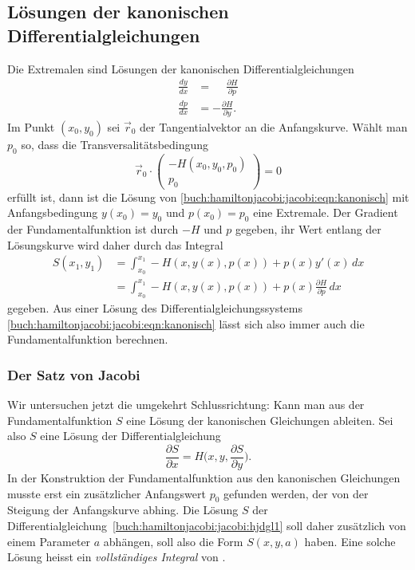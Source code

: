 %
%
\subsection{Lösungen der kanonischen Differentialgleichungen}
Die Extremalen sind Lösungen der kanonischen Differentialgleichungen
\begin{equation}
\begin{aligned}
\frac{dy}{dx}&=\phantom{-}\frac{\partial H}{\partial p}
\\
\frac{dp}{dx}&=-\frac{\partial H}{\partial y}.
\end{aligned}
\label{buch:hamiltonjacobi:jacobi:eqn:kanonisch}
\end{equation}
Im Punkt $(x_0,y_0)$ sei $\vec{r}_0$ der Tangentialvektor an die
Anfangskurve.
Wählt man $p_0$ so, dass die Transversalitätsbedingung
\[
\vec{r}_0
\cdot
\begin{pmatrix}
-H(x_0,y_0,p_0)\\
p_0
\end{pmatrix}
=
0
\]
erfüllt ist, dann ist die Lösung von
\eqref{buch:hamiltonjacobi:jacobi:eqn:kanonisch}
mit Anfangsbedingung $y(x_0)=y_0$ und $p(x_0)=p_0$ eine Extremale.
Der Gradient der Fundamentalfunktion ist durch $-H$ und $p$ gegeben,
ihr Wert entlang der Lösungskurve wird daher durch das Integral
\begin{align*}
S(x_1,y_1)
&=
\int_{x_0}^{x_1}
-H(x,y(x),p(x))
+
p(x) y'(x)
\,dx
\\
&=
\int_{x_0}^{x_1}
-H(x,y(x),p(x))
+
p(x)\frac{\partial H}{\partial p}
\,dx
\end{align*}
gegeben.
Aus einer Lösung des Differentialgleichungssystems
\eqref{buch:hamiltonjacobi:jacobi:eqn:kanonisch}
lässt sich also immer auch die Fundamentalfunktion berechnen.

%
%
\subsubsection{Der Satz von Jacobi}
Wir untersuchen jetzt die umgekehrt Schlussrichtung: Kann man aus
der Fundamentalfunktion $S$ eine Lösung der kanonischen Gleichungen 
ableiten.
Sei also $S$ eine Lösung der Differentialgleichung
\begin{equation}
\frac{\partial S}{\partial x}
=
H\biggl(x,y,\frac{\partial S}{\partial y}\biggr).
\label{buch:hamiltonjacobi:jacobi:hjdgl1}
\end{equation}
In der Konstruktion der Fundamentalfunktion aus den kanonischen Gleichungen
musste erst ein zusätzlicher Anfangswert $p_0$ gefunden werden,
der von der Steigung der Anfangskurve abhing.
Die Lösung $S$ der
Differentialgleichung~\eqref{buch:hamiltonjacobi:jacobi:hjdgl1}
soll daher zusätzlich von einem Parameter $a$ abhängen, soll also
die Form
\(
S(x,y,a)
\)
haben.
Eine solche Lösung heisst ein {\em vollständiges Integral} von
\label{buch:hamiltonjacobi:jacobi:hjdgl1}.

